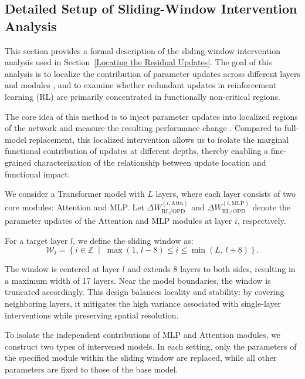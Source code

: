 \documentclass{article}
\begin{document}
\clearpage
\subsection{Detailed Setup of Sliding-Window Intervention Analysis}
\label{Detailed Setup of Sliding-Window Intervention Analysis}

This section provides a formal description of the sliding-window intervention analysis used in Section~\ref{Locating the Residual Updates}. The goal of this analysis is to localize the contribution of parameter updates across different layers and modules \citep{cai2024locatingmitigatinggenderbias,cai2025predictability}, and to examine whether redundant updates in reinforcement learning (RL) are primarily concentrated in functionally non-critical regions.

The core idea of this method is to inject parameter updates into localized regions of the network and measure the resulting performance change \citep{meng2023locatingeditingfactualassociations, vig2020investigating}. Compared to full-model replacement, this localized intervention allows us to isolate the marginal functional contribution of updates at different depths, thereby enabling a fine-grained characterization of the relationship between update location and functional impact.

We consider a Transformer model with \(L\) layers, where each layer consists of two core modules: Attention and MLP. Let \(\Delta W_{\text{RL/OPD}}^{(i,\text{Attn})}\) and \(\Delta W_{\text{RL/OPD}}^{(i,\text{MLP})}\) denote the parameter updates of the Attention and MLP modules at layer \(i\), respectively.

For a target layer \(l\), we define the sliding window as:
\begin{equation}
\mathcal{W}_l = \left\{ i \in \mathbb{Z} \;\middle|\; \max(1,\, l-8) \le i \le \min(L,\, l+8) \right\}.
\end{equation}

The window is centered at layer \(l\) and extends 8 layers to both sides, resulting in a maximum width of 17 layers. Near the model boundaries, the window is truncated accordingly. This design balances locality and stability: by covering neighboring layers, it mitigates the high variance associated with single-layer interventions while preserving spatial resolution.

To isolate the independent contributions of MLP and Attention modules, we construct two types of intervened models. In each setting, only the parameters of the specified module within the sliding window are replaced, while all other parameters are fixed to those of the base model.
\end{document}
